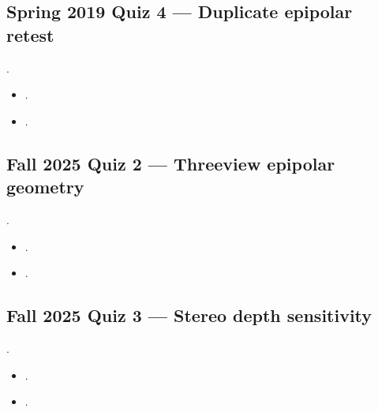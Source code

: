 \documentclass[letterpaper,11pt,english,openany,oneside]{jupyterBook}
\begin{document}
\subsection{Spring 2019 Quiz 4 — Duplicate epipolar retest}
\label{\detokenize{reference/quiz-index:spring-2019-quiz-4-duplicate-epipolar-retest}}
\sphinxAtStartPar
{} .
\begin{itemize}
\item {}
\sphinxAtStartPar
{\hyperref[\detokenize{lectures/lecture04/quiz-workbook:quiz-2-q1}]{}}.

\item {}
\sphinxAtStartPar
{\hyperref[\detokenize{lectures/lecture04/quiz-workbook:quiz-2-q2}]{}}.

\end{itemize}


\subsection{Fall 2025 Quiz 2 — Three\sphinxhyphen{}view epipolar geometry}
\label{\detokenize{reference/quiz-index:fall-2025-quiz-2-three-view-epipolar-geometry}}
\sphinxAtStartPar
{} .
\begin{itemize}
\item {}
\sphinxAtStartPar
{\hyperref[\detokenize{lectures/lecture04/quiz-workbook:quiz-3-q1}]{}}.

\item {}
\sphinxAtStartPar
{\hyperref[\detokenize{lectures/lecture04/quiz-workbook:quiz-3-q2}]{}}.

\end{itemize}


\subsection{Fall 2025 Quiz 3 — Stereo depth sensitivity}
\label{\detokenize{reference/quiz-index:fall-2025-quiz-3-stereo-depth-sensitivity}}
\sphinxAtStartPar
{} .
\begin{itemize}
\item {}
\sphinxAtStartPar
{\hyperref[\detokenize{lectures/lecture04/quiz-workbook:quiz-4-q1}]{}}.

\item {}
\sphinxAtStartPar
{\hyperref[\detokenize{lectures/lecture04/quiz-workbook:quiz-4-q2}]{}}.

\end{itemize}
\end{document}
